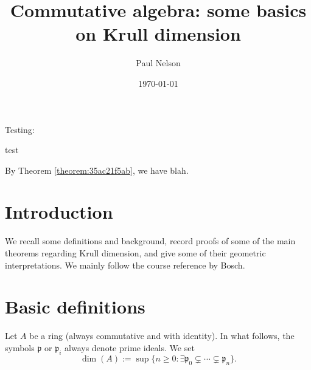 \documentclass[10pt]{article}
\author{Paul Nelson}
\date{\today}
\title{Commutative algebra: some basics on Krull dimension}
\begin{document}
\maketitle
\tableofcontents

Testing:
\begin{theorem}\label{theorem:35ac21f5ab}
test
\end{theorem}
By Theorem \ref{theorem:35ac21f5ab}, we have blah.

\section{Introduction}
\label{sec:org2573665}

We recall some definitions and background, record proofs of some
of the main theorems regarding Krull dimension, and give some of
their geometric interpretations.
We mainly follow the course reference by Bosch.

\section{Basic definitions}
\label{sec:orgdb2d3a0}

Let \(A\) be a ring (always commutative and with identity).
In what follows,
the symbols \(\mathfrak{p}\) or \(\mathfrak{p}_i\)
always denote prime ideals.
We set
\[
    \dim(A) :=
    \sup \{n \geq 0 : \exists \mathfrak{p}_0 \subsetneq \dotsb \subsetneq \mathfrak{p}_n \}.
  \]
\end{document}
